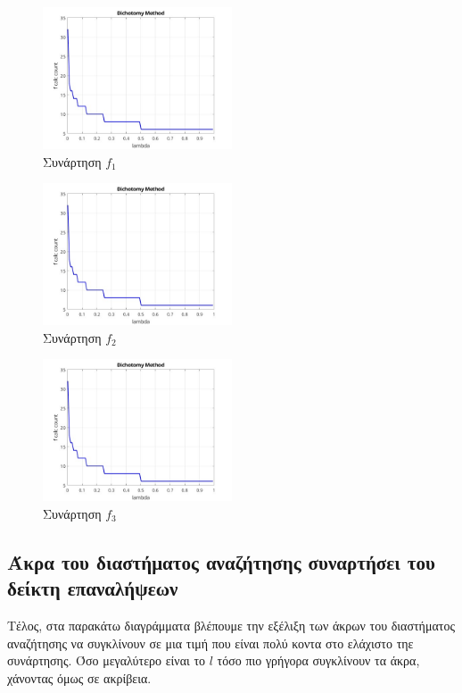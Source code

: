 \begin{figure}[H] %
    \centering
    \includegraphics[width=0.5\textwidth]{media/dichotomyf1_2} %
    \caption{Συνάρτηση $f_1$}
\end{figure}

\begin{figure}[H] %
    \centering
    \includegraphics[width=0.5\textwidth]{media/dichotomyf2_2} %
    \caption{Συνάρτηση $f_2$}
\end{figure}

\begin{figure}[H] %
    \centering
    \includegraphics[width=0.5\textwidth]{media/dichotomyf3_2} %
    \caption{Συνάρτηση $f_3$}
\end{figure}

\subsection{Άκρα του διαστήματος αναζήτησης συναρτήσει του δείκτη επαναλήψεων}
Τέλος, στα παρακάτω διαγράμματα βλέπουμε την εξέλιξη των άκρων του διαστήματος αναζήτησης να συγκλίνουν σε
μια τιμή που είναι πολύ κοντα στο ελάχιστο τηε συνάρτησης. Όσο μεγαλύτερο είναι το $l$ τόσο πιο γρήγορα
συγκλίνουν τα άκρα, χάνοντας όμως σε ακρίβεια.

